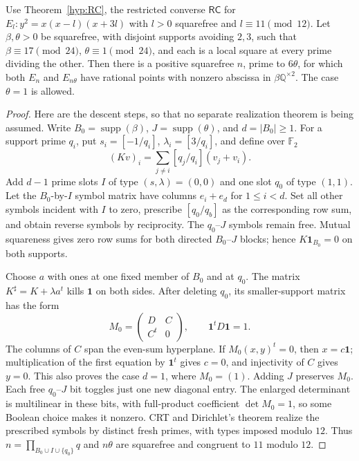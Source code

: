 \begin{lemma}
\label{lem:original-seven-simultaneous-realization}
Use Theorem~\ref{hyp:RC}, the restricted converse $\mathsf{RC}$ for
$E_l:y^2=x(x-l)(x+3l)$ with $l>0$ squarefree and $l\equiv11\pmod{12}$.
Let $\beta,\theta>0$ be squarefree, with disjoint supports avoiding
$2,3$, such that $\beta\equiv17\pmod{24}$,
$\theta\equiv1\pmod{24}$, and each is a local square at every prime
dividing the other. Then there is a positive squarefree $n$, prime
to $6\theta$, for which both $E_n$ and $E_{n\theta}$ have rational
points with nonzero abscissa in $\beta\mathbb Q^{\times2}$.
The case $\theta=1$ is allowed.
\end{lemma}
\begin{proof}
Here are the descent steps, so that no separate realization theorem
is being assumed. Write $B_0=\operatorname{supp}(\beta)$,
$J=\operatorname{supp}(\theta)$, and $d=|B_0|\ge1$.
For a support prime $q_i$, put $s_i=[-1/q_i]$, $\lambda_i=[3/q_i]$,
and define over $\mathbb F_2$
\[
 (Kv)_i=\sum_{j\ne i}[q_j/q_i](v_j+v_i).
\]
Add $d-1$ prime slots $I$ of type $(s,\lambda)=(0,0)$ and one slot
$q_0$ of type $(1,1)$. Let the $B_0$-by-$I$ symbol matrix have columns
$e_i+e_d$ for $1\le i<d$. Set all other symbols incident with $I$
to zero, prescribe $[q_0/q_b]$ as the corresponding row sum, and
obtain reverse symbols by reciprocity. The $q_0$--$J$ symbols remain
free. Mutual squareness gives zero row sums for both directed
$B_0$--$J$ blocks; hence $K\mathbf1_{B_0}=0$ on both supports.

Choose $a$ with ones at one fixed member of $B_0$ and at $q_0$.
The matrix $K^\sharp=K+\lambda a^t$ kills $\mathbf1$ on both sides.
After deleting $q_0$, its smaller-support matrix has the form
\[
 M_0=\begin{pmatrix}D&C\\C^t&0\end{pmatrix},
 \qquad \mathbf1^tD\mathbf1=1.
\]
The columns of $C$ span the even-sum hyperplane. If $M_0(x,y)^t=0$,
then $x=c\mathbf1$; multiplication of the first equation by
$\mathbf1^t$ gives $c=0$, and injectivity of $C$ gives $y=0$.
This also proves the case $d=1$, where $M_0=(1)$.
Adding $J$ preserves $M_0$. Each free $q_0$--$J$ bit toggles just
one new diagonal entry. The enlarged determinant is multilinear in
these bits, with full-product coefficient $\det M_0=1$, so some
Boolean choice makes it nonzero. CRT and Dirichlet's theorem realize
the prescribed symbols by distinct fresh primes, with types imposed
modulo $12$. Thus $n=\prod_{B_0\cup I\cup\{q_0\}}q$ and $n\theta$
are squarefree and congruent to $11$ modulo $12$.


\end{proof}
